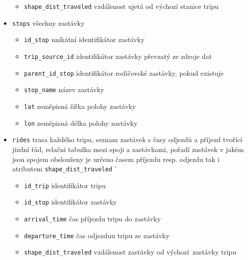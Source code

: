 \begin{itemize}
\begin{itemize}
			\item \verb-shape_dist_traveled- vzdálenost ujetá od výchozí stanice tripu

		\end{itemize}

	\item \verb-stops- všechny zastávky

		\begin{itemize}
			\item \verb-id_stop- unikátní identifikátor zastávky

			\item \verb-trip_source_id- identifikátor zastávky převzatý ze zdroje dat

			\item \verb-parent_id_stop- identifikátor rodičovské zastávky, pokud existuje

			\item \verb-stop_name- název zastávky

			\item \verb-lat- zeměpisná šířka polohy zastávky

			\item \verb-lon- zeměpisná délka polohy zastávky

		\end{itemize}

	\item \verb-rides- trasa každého tripu, seznam zastávek s časy odjezdů a příjezd tvořící jízdní řád, relační tabulka mezi spoji a zastávkami, pořadí zastávek v jakém jsou spojem obslouženy je určeno časem příjezdu resp. odjezdu tak i atributem \verb-shape_dist_traveled- \label{table:rides}'

	\begin{itemize}
		\item \verb-id_trip- identifikátor tripu

		\item \verb-id_stop- identifikátor zastávky

		\item \verb-arrival_time- čas příjezdu tripu do zastávky

		\item \verb-departure_time- čas odjezduu tripu ze zastávky

		\item \verb-shape_dist_traveled- vzdálenost zastávky od výchozí zastávky tripu

	\end{itemize}

\end{itemize}

